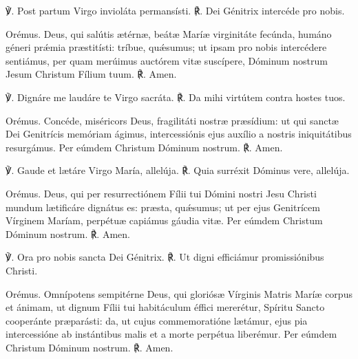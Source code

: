 
℣. Post partum Virgo invioláta permansísti.
℟. Dei Génitrix intercéde pro nobis.

Orémus.
Deus, qui salútis ætérnæ, 
beátæ Maríæ virginitáte fecúnda,
humáno géneri prǽmia præstitísti:
tríbue, quǽsumus; ut ipsam pro nobis intercédere sentiámus,
per quam merúimus auctórem vitæ suscípere,
Dóminum nostrum Jesum Christum Fílium tuum.
℟. Amen.

\noindent \hrulefill



℣. Dignáre me laudáre te Virgo sacráta.
℟. Da mihi virtútem contra hostes tuos.

Orémus.
Concéde, miséricors Deus, fragilitáti nostræ præsídium:
ut qui sanctæ Dei Genitrícis memóriam ágimus,
intercessiónis ejus auxílio a nostris iniquitátibus resurgámus.
Per eúmdem Christum Dóminum nostrum.
℟. Amen. 

\pagebreak



\vspace{2mm}
℣. Gaude et lætáre Virgo María, allelúja.
℟. Quia surréxit Dóminus vere, allelúja.

\vspace{3mm}
Orémus.
Deus, qui per resurrectiónem Fílii tui Dómini nostri Jesu Christi
mundum lætificáre dignátus es:
præsta, quǽsumus; ut per ejus Genitrícem Vírginem Maríam,
perpétuæ capiámus gáudia vitæ.
Per eúmdem Christum Dóminum nostrum.
℟. Amen. 

\noindent \hrulefill



\vspace{2mm}
℣. Ora pro nobis sancta Dei Génitrix.
℟. Ut digni efficiámur promissiónibus Christi.

\vspace{3mm}
Orémus.
Omnípotens sempitérne Deus,
qui gloriósæ Vírginis Matris Maríæ corpus et ánimam,
ut dignum Fílii tui habitáculum éffici mererétur,
Spíritu Sancto cooperánte præparásti:
da, ut cujus commemoratióne lætámur,
ejus pia intercessióne ab instántibus malis et a morte perpétua liberémur.
Per eúmdem Christum Dóminum nostrum. 
℟. Amen.

